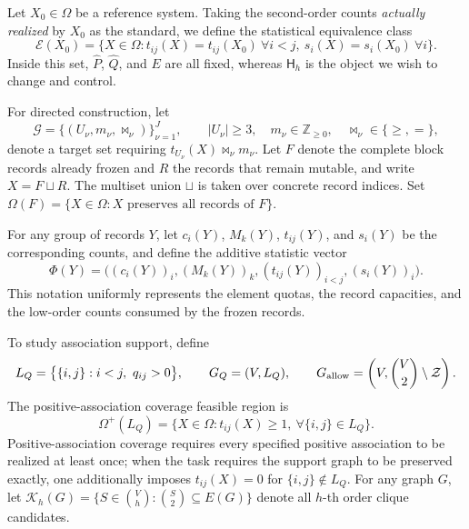 \documentclass[11pt,a4paper]{article}
\numberwithin{equation}{section}
\theoremstyle{definition}
\numberwithin{algorithm}{section}
\begin{document}
Let $X_0\in\Omega$ be a reference system.
Taking the second-order counts \emph{actually realized} by $X_0$ as the standard,
we define the statistical equivalence class
\begin{equation}
\mathcal E(X_0)=\bigl\{X\in\Omega:
t_{ij}(X)=t_{ij}(X_0)\ \forall i<j,\
s_i(X)=s_i(X_0)\ \forall i\bigr\}.
\label{eq:equivalence-class}
\end{equation}
Inside this set, $\widehat P$, $\widehat Q$, and $E$ are all fixed,
whereas $\mathsf H_h$ is the object we wish to change and control.

For directed construction, let
\begin{equation}
\mathcal G=\{(U_\nu,m_\nu,\bowtie_\nu)\}_{\nu=1}^{J},
\qquad |U_\nu|\ge3,\quad m_\nu\in\mathbb Z_{\ge0},\quad
\bowtie_\nu\in\{\ge,=\},
\label{eq:directed-goals}
\end{equation}
denote a target set requiring $t_{U_\nu}(X)\bowtie_\nu m_\nu$.
Let $F$ denote the complete block records already frozen and $R$ the records that remain
mutable, and write $X=F\sqcup R$.
The multiset union $\sqcup$ is taken over concrete record indices.
Set $\Omega(F)=\{X\in\Omega:X\text{ preserves all records of }F\}$.

For any group of records $Y$, let $c_i(Y)$, $M_k(Y)$, $t_{ij}(Y)$, and $s_i(Y)$ be the
corresponding counts, and define the additive statistic vector
\begin{equation}
\Phi(Y)=\bigl((c_i(Y))_i,(M_k(Y))_k,
(t_{ij}(Y))_{i<j},(s_i(Y))_i\bigr).
\label{eq:phi-definition}
\end{equation}
This notation uniformly represents the element quotas, the record capacities, and the
low-order counts consumed by the frozen records.

To study association support, define
\begin{equation}
L_Q=\bigl\{\{i,j\}:i<j,\ q_{ij}>0\bigr\},\qquad
G_Q=(V,L_Q),\qquad
G_{\rm allow}=\left(V,\binom V2\setminus\mathcal Z\right).
\label{eq:support-graphs}
\end{equation}
The positive-association coverage feasible region is
\begin{equation}
\Omega^+(L_Q)=\{X\in\Omega:t_{ij}(X)\ge1,\ \forall\{i,j\}\in L_Q\}.
\label{eq:positive-support-domain}
\end{equation}
Positive-association coverage requires every specified positive association to be realized
at least once; when the task requires the support graph to be preserved exactly, one
additionally imposes $t_{ij}(X)=0$ for $\{i,j\}\notin L_Q$.
For any graph $G$, let
$\mathcal K_h(G)=\{S\in\binom Vh:\binom S2\subseteq E(G)\}$ denote all $h$-th order
clique candidates.
\end{document}
